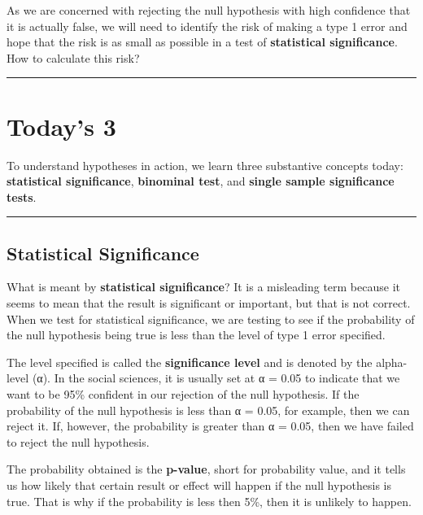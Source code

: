 \documentclass[
]{book}
\begin{document}
As we are concerned with rejecting the null hypothesis with high confidence that it is actually false, we will need to identify the risk of making a type 1 error and hope that the risk is as small as possible in a test of \textbf{statistical significance}. How to calculate this risk?

\begin{center}\rule{0.5\linewidth}{0.5pt}\end{center}

\hypertarget{todays-3-3}{%
\section{Today's 3}\label{todays-3-3}}

To understand hypotheses in action, we learn three substantive concepts today: \textbf{statistical significance}, \textbf{binominal test}, and \textbf{single sample significance tests}.

\begin{center}\rule{0.5\linewidth}{0.5pt}\end{center}

\hypertarget{statistical-significance}{%
\subsection{Statistical Significance}\label{statistical-significance}}

What is meant by \textbf{statistical significance}? It is a misleading term because it seems to mean that the result is significant or important, but that is not correct. When we test for statistical significance, we are testing to see if the probability of the null hypothesis being true is less than the level of type 1 error specified.

The level specified is called the \textbf{significance level} and is denoted by the alpha-level (α). In the social sciences, it is usually set at α = 0.05 to indicate that we want to be 95\% confident in our rejection of the null hypothesis. If the probability of the null hypothesis is less than α = 0.05, for example, then we can reject it. If, however, the probability is greater than α = 0.05, then we have failed to reject the null hypothesis.

The probability obtained is the \textbf{p-value}, short for probability value, and it tells us how likely that certain result or effect will happen if the null hypothesis is true. That is why if the probability is less then 5\%, then it is unlikely to happen.
\end{document}
